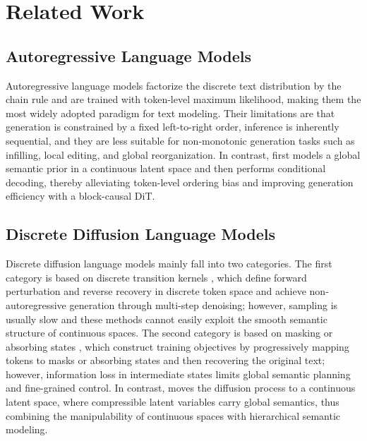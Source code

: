 \section{Related Work}

\subsection{Autoregressive Language Models}
Autoregressive language models \citep{radford2019language,touvron2023llama,yang2025qwen3,liu2024deepseek} factorize the discrete text distribution by the chain rule and are trained with token-level maximum likelihood, making them the most widely adopted paradigm for text modeling. Their limitations are that generation is constrained by a fixed left-to-right order, inference is inherently sequential, and they are less suitable for non-monotonic generation tasks such as infilling, local editing, and global reorganization. In contrast, \method first models a global semantic prior in a continuous latent space and then performs conditional decoding, thereby alleviating token-level ordering bias and improving generation efficiency with a block-causal DiT.

\subsection{Discrete Diffusion Language Models}
Discrete diffusion language models mainly fall into two categories. The first category is based on discrete transition kernels \citep{austin2021structured,campbell2022continuous,sun2022score}, which define forward perturbation and reverse recovery in discrete token space and achieve non-autoregressive generation through multi-step denoising; however, sampling is usually slow and these methods cannot easily exploit the smooth semantic structure of continuous spaces. The second category is based on masking or absorbing states \citep{sahoo2024simple,nie2025large,zhu2025llada,you2025llada,zhu2025lladamoe,shi2024simplified,zheng2025continuously,zheng2024masked,sahoo2025diffusion,nie2024scaling}, which construct training objectives by progressively mapping tokens to masks or absorbing states and then recovering the original text; however, information loss in intermediate states limits global semantic planning and fine-grained control. In contrast, \method moves the diffusion process to a continuous latent space, where compressible latent variables carry global semantics, thus combining the manipulability of continuous spaces with hierarchical semantic modeling.

